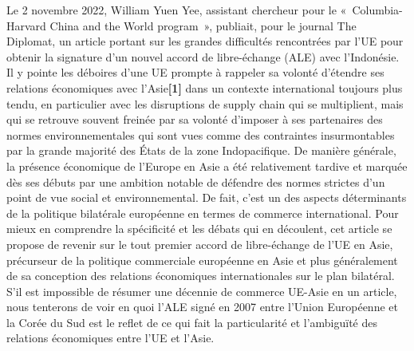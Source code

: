 \documentclass[11pt,a4paper]{article}
\begin{document}
\thispagestyle{empty}
\par\medskip
{}
\smallskip{}
\medskip
\noindent{\color{accent}\rule{\linewidth}{0.8pt}}\par\smallskip
{}\par
\smallskip{}\par\bigskip

Le 2 novembre 2022, William Yuen Yee, assistant chercheur pour le «~Columbia-Harvard China and the World program~», publiait, pour le journal The Diplomat, un article portant sur les grandes difficultés rencontrées par l'UE pour obtenir la signature d'un nouvel accord de libre-échange (ALE) avec l'Indonésie. Il y pointe les déboires d'une UE prompte à rappeler sa volonté d'étendre ses relations économiques avec l'Asie\textbf{{[}1{]}} dans un contexte international toujours plus tendu, en particulier avec les disruptions de supply chain qui se multiplient, mais qui se retrouve souvent freinée par sa volonté d'imposer à ses partenaires des normes environnementales qui sont vues comme des contraintes insurmontables par la grande majorité des États de la zone Indopacifique. De manière générale, la présence économique de l'Europe en Asie a été relativement tardive et marquée dès ses débuts par une ambition notable de défendre des normes strictes d'un point de vue social et environnemental. De fait, c'est un des aspects déterminants de la politique bilatérale européenne en termes de commerce international. Pour mieux en comprendre la spécificité et les débats qui en découlent, cet article se propose de revenir sur le tout premier accord de libre-échange de l'UE en Asie, précurseur de la politique commerciale européenne en Asie et plus généralement de sa conception des relations économiques internationales sur le plan bilatéral. S'il est impossible de résumer une décennie de commerce UE-Asie en un article, nous tenterons de voir en quoi l'ALE signé en 2007 entre l'Union Européenne et la Corée du Sud est le reflet de ce qui fait la particularité et l'ambiguïté des relations économiques entre l'UE et l'Asie.
\end{document}
